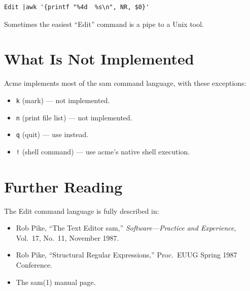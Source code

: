 \begin{Verbatim}[frame=single]
Edit |awk '{printf "%4d  %s\n", NR, $0}'
\end{Verbatim}

\noindent
Sometimes the easiest ``Edit'' command is a pipe to a Unix tool.

\section{What Is Not Implemented}

Acme implements most of the sam command language, with these exceptions:

\begin{itemize}
\item \texttt{k} (mark) --- not implemented.
\item \texttt{n} (print file list) --- not implemented.
\item \texttt{q} (quit) --- use  instead.
\item \texttt{!} (shell command) --- use acme's native shell execution.
\end{itemize}

\section{Further Reading}

The Edit command language is fully described in:

\begin{itemize}
\item Rob Pike, ``The Text Editor sam,'' \emph{Software---Practice and
      Experience}, Vol.~17, No.~11, November 1987.
\item Rob Pike, ``Structural Regular Expressions,'' Proc.\ EUUG Spring
      1987 Conference.
\item The sam(1) manual page.
\end{itemize}
